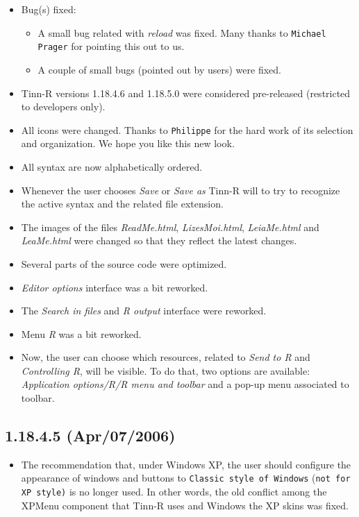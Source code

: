 \begin{itemize}
  \item Bug(s) fixed:
    \begin{itemize}
      \item A small bug related with \textit{reload} was fixed. Many
        thanks to \texttt{Michael Prager} for pointing this out to us.
      \item A couple of small bugs (pointed out by users) were fixed.
    \end{itemize}
  \item Tinn-R versions 1.18.4.6 and 1.18.5.0 were considered pre-released
    (restricted to developers only).
  \item All icons were changed. Thanks to \texttt{Philippe} for the hard
    work of its selection and organization. We hope you like this new look.
  \item All syntax are now alphabetically ordered.
  \item Whenever the user chooses \textit{Save} or \textit{Save as}
    Tinn-R will to try to recognize the active syntax and the related file
    extension.
  \item The images of the files \textit{ReadMe.html}, \textit{LizesMoi.html},
    \textit{LeiaMe.html} and \textit{LeaMe.html} were changed so that they
    reflect the latest changes.
  \item Several parts of the source code were optimized.
  \item \textit{Editor options} interface was a bit reworked.
  \item The \textit{Search in files} and \textit{R output} interface were
    reworked.
  \item Menu \textit{R} was a bit reworked.
  \item Now, the user can choose which \RR{} resources, related to
    \textit{Send to R} and \textit{Controlling R}, will be visible.
    To do that, two options are available:
    \textit{Application options/R/R menu and toolbar} and a pop-up
    menu associated to \RR{} toolbar.
\end{itemize}


\subsection{1.18.4.5 (Apr/07/2006)}

\begin{itemize}
  \item The recommendation that, under Windows XP, the user should configure the
    appearance of windows and buttons to \texttt{Classic style of Windows}
    (\texttt{not for XP style)} is no longer used. In other words,
    the old conflict among the XPMenu component that Tinn-R uses and Windows
    the XP skins was fixed.
\end{itemize}


